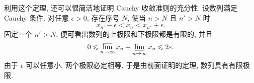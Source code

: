 利用这个定理, 还可以很简洁地证明 Cauchy 收敛准则的充分性.
设数列满足 Cauchy 条件. 对任意 $\epsilon>0$, 存在序号 $N$,
使当 $n>N$ 且 $n'>N$ 时
$$
x_{n'}-\epsilon<x_n<x_{n'}+\epsilon.
$$
固定一个 $n'>N$, 便可看出数列的上极限和下极限都是有限的, 并且
$$
0\leqslant
\varlimsup\limits_{n \to \infty}x_n-\varliminf\limits_{n \to \infty}x_n
\leqslant2\varepsilon.
$$
由于 $\epsilon$ 可以任意小, 两个极限必定相等.
于是由前面证明的定理,
数列具有有限极限.
